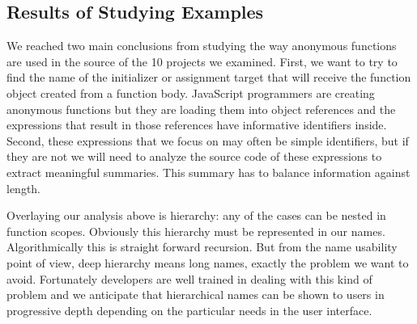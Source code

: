 \documentclass[10pt, preprint]{sigplanconf}
\begin{document}
\subsection{Results of Studying Examples}
We reached two main conclusions from studying the way anonymous functions are used in the source of the 10 projects we examined. First, we want to try to find the name of the initializer or assignment target that will receive the function object created from a function body.  JavaScript programmers are creating anonymous functions but they are loading them into object references and the expressions that result in those references have informative identifiers inside. Second, these expressions that we focus on may often be simple identifiers, but if they are not we will need to analyze the source code of these expressions to extract meaningful summaries. This summary has to balance information against length.

Overlaying our analysis above is hierarchy: any of the cases can be nested in function scopes. Obviously this hierarchy must be represented in our names. Algorithmically this is straight forward recursion. But from the name usability point of view, deep hierarchy means long names, exactly the problem we want to avoid. Fortunately developers are well trained in dealing with this kind of problem and we anticipate that hierarchical names can be shown to users in progressive depth depending on the particular needs in the user interface.


\end{document}

